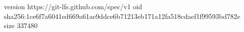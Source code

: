 version https://git-lfs.github.com/spec/v1
oid sha256:1ce6f7a6041ed669a61ae9ddce6b71213eb171a12fa518cdaef1f99593bd782e
size 337480
